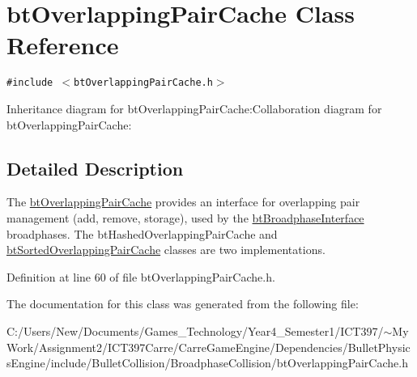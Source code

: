 \hypertarget{classbt_overlapping_pair_cache}{
\section{btOverlappingPairCache Class Reference}
\label{classbt_overlapping_pair_cache}
}
{\tt \#include $<$btOverlappingPairCache.h$>$}

Inheritance diagram for btOverlappingPairCache:Collaboration diagram for btOverlappingPairCache:

\subsection{Detailed Description}
The \hyperlink{classbt_overlapping_pair_cache}{btOverlappingPairCache} provides an interface for overlapping pair management (add, remove, storage), used by the \hyperlink{classbt_broadphase_interface}{btBroadphaseInterface} broadphases. The btHashedOverlappingPairCache and \hyperlink{classbt_sorted_overlapping_pair_cache}{btSortedOverlappingPairCache} classes are two implementations. 

Definition at line 60 of file btOverlappingPairCache.h.

The documentation for this class was generated from the following file:\begin{CompactItemize}
\item 
C:/Users/New/Documents/Games\_\-Technology/Year4\_\-Semester1/ICT397/$\sim$My Work/Assignment2/ICT397Carre/CarreGameEngine/Dependencies/BulletPhysicsEngine/include/BulletCollision/BroadphaseCollision/btOverlappingPairCache.h\end{CompactItemize}
